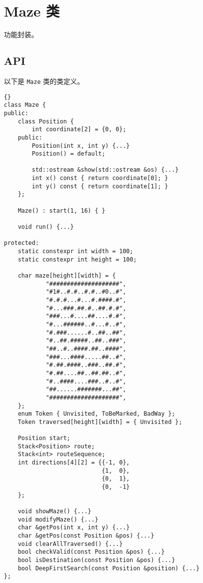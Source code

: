 \chapter{Maze 类}

功能封装。

\section{API}

以下是 \lstinline{Maze} 类的类定义。
{
\begin{lstlisting}[firstnumber=121, caption=Maze 类定义]{}
class Maze {
public:
    class Position {
        int coordinate[2] = {0, 0};
    public:
        Position(int x, int y) {...}
        Position() = default;

        std::ostream &show(std::ostream &os) {...}
        int x() const { return coordinate[0]; }
        int y() const { return coordinate[1]; }
    };

    Maze() : start(1, 16) { }

    void run() {...}

protected:
    static constexpr int width = 100;
    static constexpr int height = 100;

    char maze[height][width] = {
            "####################",
            "#1#..#.#..#.#..#0..#",
            "#.#.#...#...#.####.#",
            "#...###.##.#..##.#.#",
            "###...#....##....#.#",
            "#...######..#...#..#",
            "#.###......#..##..##",
            "#..##.#####..##..###",
            "##..#..####.##..####",
            "###...####.....##..#",
            "#.##.####..###..##.#",
            "#.##....##..##.##..#",
            "#..####....###..#..#",
            "##......#######...##",
            "####################",
    };
    enum Token { Unvisited, ToBeMarked, BadWay };
    Token traversed[height][width] = { Unvisited };

    Position start;
    Stack<Position> route;
    Stack<int> routeSequence;
    int directions[4][2] = {{-1, 0},
                            {1,  0},
                            {0,  1},
                            {0,  -1}
    };

    void showMaze() {...}
    void modifyMaze() {...}
    char &getPos(int x, int y) {...}
    char &getPos(const Position &pos) {...}
    void clearAllTraversed() {...}
    bool checkValid(const Position &pos) {...}
    bool isDestination(const Position &pos) {...}
    bool DeepFirstSearch(const Position &position) {...}
};  
\end{lstlisting}


}
